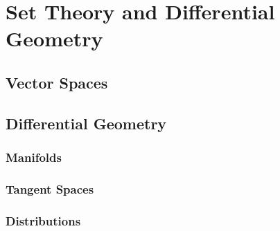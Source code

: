 
\chapter{Set Theory and Differential Geometry}

\section{Vector Spaces}\label{vectorspaces}


\section{Differential Geometry}
\subsection{Manifolds}
\subsection{Tangent Spaces}\label{tangentspaces}
\subsection{Distributions}
%